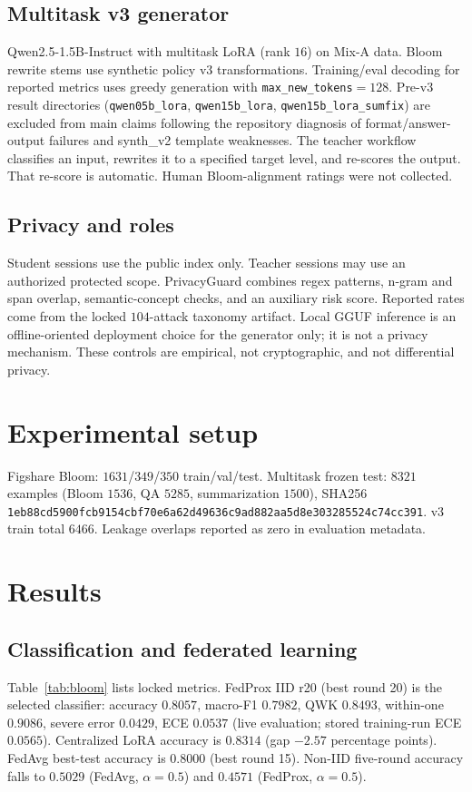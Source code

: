 \documentclass[review,12pt]{elsarticle}
\begin{document}
\subsection{Multitask v3 generator}
Qwen2.5-1.5B-Instruct with multitask LoRA (rank $16$) on Mix-A data.
Bloom rewrite stems use synthetic policy v3 transformations.
Training/eval decoding for reported metrics uses greedy generation with \texttt{max\_new\_tokens}${}={}128$.
Pre-v3 result directories (\texttt{qwen05b\_lora}, \texttt{qwen15b\_lora}, \texttt{qwen15b\_lora\_sumfix}) are excluded from main claims following the repository diagnosis of format/answer-output failures and synth\_v2 template weaknesses.
The teacher workflow classifies an input, rewrites it to a specified target level, and re-scores the output.
That re-score is automatic.
Human Bloom-alignment ratings were not collected.

\subsection{Privacy and roles}
Student sessions use the public index only.
Teacher sessions may use an authorized protected scope.
PrivacyGuard combines regex patterns, n-gram and span overlap, semantic-concept checks, and an auxiliary risk score.
Reported rates come from the locked $104$-attack taxonomy artifact.
Local GGUF inference is an offline-oriented deployment choice for the generator only; it is not a privacy mechanism.
These controls are empirical, not cryptographic, and not differential privacy.

\section{Experimental setup}
Figshare Bloom: $1631$/$349$/$350$ train/val/test.
Multitask frozen test: $8321$ examples (Bloom $1536$, QA $5285$, summarization $1500$), SHA256 \texttt{1eb88cd5900fcb9154cbf70e6a62d49636c9ad882aa5d8e303285524c74cc391}.
v3 train total $6466$.
Leakage overlaps reported as zero in evaluation metadata.

\section{Results}

\subsection{Classification and federated learning}
Table~\ref{tab:bloom} lists locked metrics.
FedProx IID r20 (best round 20) is the selected classifier: accuracy $0.8057$, macro-F1 $0.7982$, QWK $0.8493$, within-one $0.9086$, severe error $0.0429$, ECE $0.0537$ (live evaluation; stored training-run ECE $0.0565$).
Centralized LoRA accuracy is $0.8314$ (gap $-2.57$ percentage points).
FedAvg best-test accuracy is $0.8000$ (best round 15).
Non-IID five-round accuracy falls to $0.5029$ (FedAvg, $\alpha{=}0.5$) and $0.4571$ (FedProx, $\alpha{=}0.5$).
\end{document}
